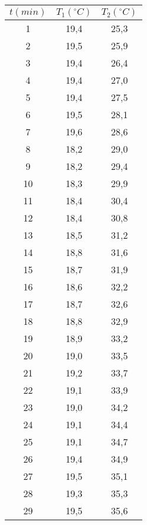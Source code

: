 \documentclass[12pt, a4paper, titlepage]{article}
\begin{document}
  \begin{table}[H] 
    \centering
    \begin{minipage}[c]{0,4\textwidth}
      \begin{table}[H]
        \centering
        \begin{tabular}{|c|c|c|}
        \hline
        $t(min)$  & $T_1 (^{\circ} C)$ & $T_2 (^{\circ} C)$ \\ \hline
        1  & 19,4  & 25,3  \\ \hline
        2  & 19,5  & 25,9  \\ \hline
        3  & 19,4  & 26,4  \\ \hline
        4  & 19,4  & 27,0  \\ \hline
        5  & 19,4  & 27,5  \\ \hline
        6  & 19,5  & 28,1  \\ \hline
        7  & 19,6  & 28,6  \\ \hline
        8  & 18,2  & 29,0  \\ \hline
        9  & 18,2  & 29,4  \\ \hline
        10 & 18,3  & 29,9  \\ \hline
        11 & 18,4  & 30,4  \\ \hline
        12 & 18,4  & 30,8  \\ \hline
        13 & 18,5  & 31,2  \\ \hline
        14 & 18,8  & 31,6  \\ \hline
        15 & 18,7  & 31,9  \\ \hline
        16 & 18,6  & 32,2  \\ \hline
        17 & 18,7  & 32,6  \\ \hline
        18 & 18,8  & 32,9  \\ \hline
        19 & 18,9  & 33,2  \\ \hline
        20 & 19,0  & 33,5  \\ \hline
        21 & 19,2  & 33,7  \\ \hline
        22 & 19,1  & 33,9  \\ \hline
        23 & 19,0  & 34,2  \\ \hline
        24 & 19,1  & 34,4  \\ \hline
        25 & 19,1  & 34,7  \\ \hline
        26 & 19,4  & 34,9  \\ \hline
        27 & 19,5  & 35,1  \\ \hline
        28 & 19,3  & 35,3  \\ \hline
        29 & 19,5  & 35,6  \\ \hline

\end{tabular}
\end{table}
\end{minipage}
\end{table}
\end{document}
